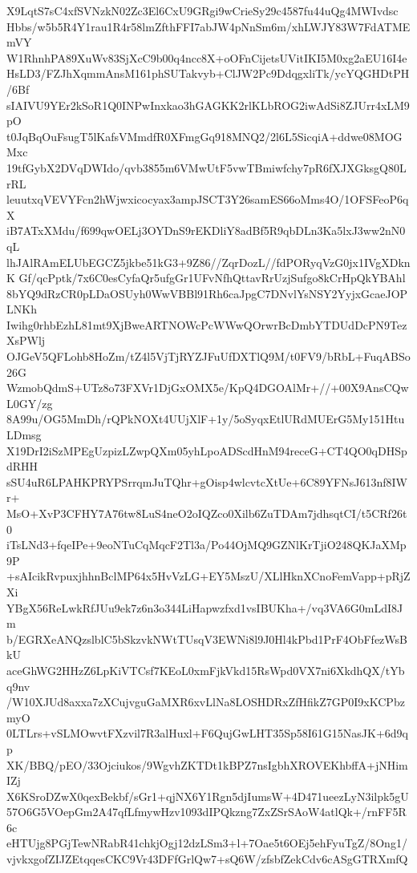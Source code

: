 X9LqtS7sC4xfSVNzkN02Zc3El6CxU9GRgi9wCrieSy29c4587fu44uQg4MWIvdsc
Hbbs/w5b5R4Y1rau1R4r58lmZfthFFI7abJW4pNnSm6m/xhLWJY83W7FdATMEmVY
W1RhnhPA89XuWv83SjXcC9b00q4ncc8X+oOFnCijetsUVitIKI5M0xg2aEU16I4e
HsLD3/FZJhXqmmAnsM161phSUTakvyb+ClJW2Pc9DdqgxliTk/ycYQGHDtPH/6Bf
sIAIVU9YEr2kSoR1Q0INPwInxkao3hGAGKK2rlKLbROG2iwAdSi8ZJUrr4xLM9pO
t0JqBqOuFsugT5lKafsVMmdfR0XFmgGq918MNQ2/2l6L5SicqiA+ddwe08MOGMxc
19tfGybX2DVqDWIdo/qvb3855m6VMwUtF5vwTBmiwfchy7pR6fXJXGksgQ80LrRL
leuutxqVEVYFcn2hWjwxicocyax3ampJSCT3Y26samES66oMms4O/1OFSFeoP6qX
iB7ATxXMdu/f699qwOELj3OYDnS9rEKDliY8adBf5R9qbDLn3Ka5lxJ3ww2nN0qL
lhJAlRAmELUbEGCZ5jkbe51kG3+9Z86//ZqrDozL//fdPORyqVzG0jx1IVgXDknK
Gf/qcPptk/7x6C0esCyfaQr5ufgGr1UFvNfhQttavRrUzjSufgo8kCrHpQkYBAhl
8bYQ9dRzCR0pLDaOSUyh0WwVBBl91Rh6caJpgC7DNvlYsNSY2YyjxGcaeJOPLNKh
Iwihg0rhbEzhL81mt9XjBweARTNOWcPcWWwQOrwrBcDmbYTDUdDcPN9TezXsPWlj
OJGeV5QFLohb8HoZm/tZ4l5VjTjRYZJFuUfDXTlQ9M/t0FV9/bRbL+FuqABSo26G
WzmobQdmS+UTz8o73FXVr1DjGxOMX5e/KpQ4DGOAlMr+//+00X9AnsCQwL0GY/zg
8A99u/OG5MmDh/rQPkNOXt4UUjXlF+1y/5oSyqxEtlURdMUErG5My151HtuLDmsg
X19DrI2iSzMPEgUzpizLZwpQXm05yhLpoADScdHnM94receG+CT4QO0qDHSpdRHH
sSU4uR6LPAHKPRYPSrrqmJuTQhr+gOisp4wlcvtcXtUe+6C89YFNsJ613nf8IWr+
MsO+XvP3CFHY7A76tw8LuS4neO2oIQZco0Xilb6ZuTDAm7jdhsqtCI/t5CRf26t0
iTsLNd3+fqeIPe+9eoNTuCqMqcF2Tl3a/Po44OjMQ9GZNlKrTjiO248QKJaXMp9P
+sAIcikRvpuxjhhnBclMP64x5HvVzLG+EY5MszU/XLlHknXCnoFemVapp+pRjZXi
YBgX56ReLwkRfJUu9ek7z6n3o344LiHapwzfxd1vsIBUKha+/vq3VA6G0mLdI8Jm
b/EGRXeANQzslblC5bSkzvkNWtTUsqV3EWNi8l9J0Hl4kPbd1PrF4ObFfezWsBkU
aceGhWG2HHzZ6LpKiVTCsf7KEoL0xmFjkVkd15RsWpd0VX7ni6XkdhQX/tYbq9nv
/W10XJUd8axxa7zXCujvguGaMXR6xvLlNa8LOSHDRxZfHfikZ7GP0I9xKCPbzmyO
0LTLrs+vSLMOwvtFXzvil7R3alHuxl+F6QujGwLHT35Sp58I61G15NasJK+6d9qp
XK/BBQ/pEO/33Ojciukos/9WgvhZKTDt1kBPZ7nsIgbhXROVEKhbffA+jNHimIZj
X6KSroDZwX0qexBekbf/sGr1+qjNX6Y1Rgn5djIumsW+4D471ueezLyN3ilpk5gU
57O6G5VOepGm2A47qfLfmywHzv1093dIPQkzng7ZxZSrSAoW4atlQk+/rnFF5R6c
eHTUjg8PGjTewNRabR41chkjOgj12dzLSm3+l+7Oae5t6OEj5ehFyuTgZ/8Ong1/
vjvkxgofZIJZEtqqesCKC9Vr43DFfGrlQw7+sQ6W/zfsbfZekCdv6cASgGTRXmfQ
